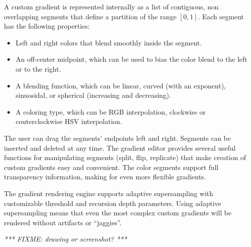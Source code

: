 \documentclass[12pt]{article}
\newcommand{\FIXME}[1]{\emph{*** FIXME: #1 ***}}
\begin{document}
A custom gradient is represented internally as a list of contiguous,
non overlapping segments that define a partition of the range $[0, 1]$.  
Each segment has the following properties:

\begin{itemize}

\item Left and right colors that blend smoothly inside the segment.

\item An off-center midpoint, which can be used to bias the color
blend to the left or to the right.

\item A blending function, which can be linear, curved (with an
exponent), sinuosidal, or spherical (increasing and decreasing).

\item A coloring type, which can be RGB interpolation, clockwise or
couterclockwise HSV interpolation.

\end{itemize}

The user can drag the segments' endpoints left and right.  Segments
can be inserted and deleted at any time.  The gradient editor provides
several useful functions for manipulating segments (split, flip,
replicate) that make creation of custom gradients easy and convenient.
The color segments support full transparency information, making for
even more flexible gradients.

The gradient rendering engine supports adaptive supersampling with
customizable threshold and recursion depth parameters.  Using adaptive
supersampling means that even the most complex custom gradients will
be rendered without artifacts or ``jaggies''.

\FIXME{drawing or screenshot?}
\end{document}
